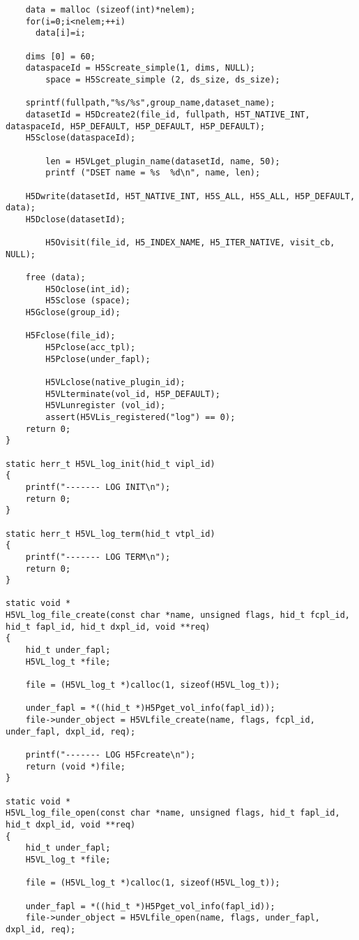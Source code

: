 \begin{lstlisting}
	data = malloc (sizeof(int)*nelem);
	for(i=0;i<nelem;++i)
	  data[i]=i;

	dims [0] = 60;
	dataspaceId = H5Screate_simple(1, dims, NULL); 
        space = H5Screate_simple (2, ds_size, ds_size);

	sprintf(fullpath,"%s/%s",group_name,dataset_name);
	datasetId = H5Dcreate2(file_id, fullpath, H5T_NATIVE_INT, dataspaceId, H5P_DEFAULT, H5P_DEFAULT, H5P_DEFAULT);
	H5Sclose(dataspaceId);

        len = H5VLget_plugin_name(datasetId, name, 50);
        printf ("DSET name = %s  %d\n", name, len);

	H5Dwrite(datasetId, H5T_NATIVE_INT, H5S_ALL, H5S_ALL, H5P_DEFAULT, data);
	H5Dclose(datasetId);

        H5Ovisit(file_id, H5_INDEX_NAME, H5_ITER_NATIVE, visit_cb, NULL);

	free (data);
        H5Oclose(int_id);
        H5Sclose (space);
	H5Gclose(group_id);

	H5Fclose(file_id);
        H5Pclose(acc_tpl);
        H5Pclose(under_fapl);

        H5VLclose(native_plugin_id);
        H5VLterminate(vol_id, H5P_DEFAULT);
        H5VLunregister (vol_id);
        assert(H5VLis_registered("log") == 0);
	return 0;
}

static herr_t H5VL_log_init(hid_t vipl_id)
{
    printf("------- LOG INIT\n");
    return 0;
}

static herr_t H5VL_log_term(hid_t vtpl_id)
{
    printf("------- LOG TERM\n");
    return 0;
}

static void *
H5VL_log_file_create(const char *name, unsigned flags, hid_t fcpl_id, hid_t fapl_id, hid_t dxpl_id, void **req)
{
    hid_t under_fapl;
    H5VL_log_t *file;

    file = (H5VL_log_t *)calloc(1, sizeof(H5VL_log_t));

    under_fapl = *((hid_t *)H5Pget_vol_info(fapl_id));
    file->under_object = H5VLfile_create(name, flags, fcpl_id, under_fapl, dxpl_id, req);

    printf("------- LOG H5Fcreate\n");
    return (void *)file;
}

static void *
H5VL_log_file_open(const char *name, unsigned flags, hid_t fapl_id, hid_t dxpl_id, void **req)
{
    hid_t under_fapl;
    H5VL_log_t *file;

    file = (H5VL_log_t *)calloc(1, sizeof(H5VL_log_t));

    under_fapl = *((hid_t *)H5Pget_vol_info(fapl_id));
    file->under_object = H5VLfile_open(name, flags, under_fapl, dxpl_id, req);


\end{lstlisting}
